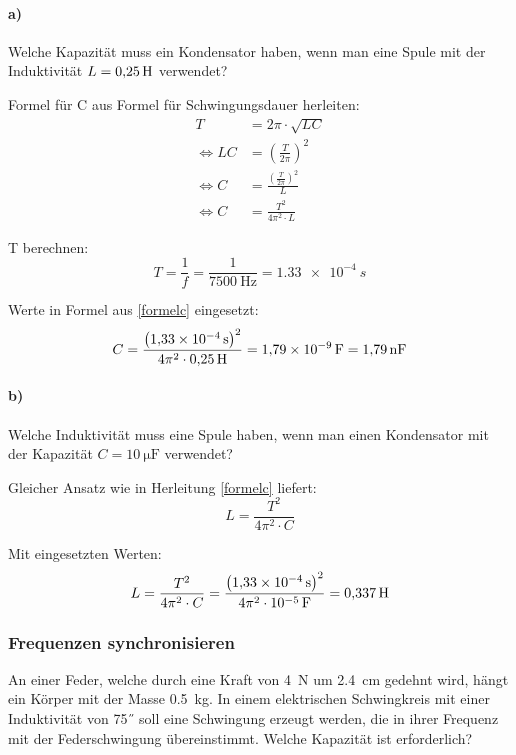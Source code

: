 \documentclass{ajc}
\begin{document}
	\paragraph{a)} Welche Kapazität muss ein Kondensator haben, wenn man eine Spule mit der Induktivität $L = \SI{0,25}{\H}$ verwendet?
	
	Formel für C aus Formel für Schwingungsdauer herleiten:
	\begin{equation}\label{formelc}
		\begin{split}
			T &= 2\pi \cdot \sqrt{LC} \\
			\Leftrightarrow LC &= \left(\frac{T}{2\pi}\right)^2 \\
			\Leftrightarrow C &= \frac{\left(\frac{T}{2\pi}\right)^2}{L} \\
			\Leftrightarrow C &= \frac{T^2}{4\pi^2 \cdot L}
		\end{split}
	\end{equation}
	
	T berechnen:
	\begin{equation}
		T = \frac{1}{f} = \frac{1}{\SI{7500}{\Hz}} = \SI{1,33e-4}{s}
	\end{equation}
	
	Werte in Formel aus \ref{formelc} eingesetzt:
	\begin{equation}
		C = \frac{\left(\SI{1,33e-4}{s}\right)^2}{4\pi^2 \cdot \SI{0,25}{\H}} = \SI{1,79e-9}{\farad} = \SI{1,79}{\nano\farad}
	\end{equation}
	
	\paragraph{b)} Welche Induktivität muss eine Spule haben, wenn man einen Kondensator mit der Kapazität $C = \SI{10}{\micro\farad}$ verwendet?
	
	Gleicher Ansatz wie in Herleitung \ref{formelc} liefert:
	\begin{equation}
		L = \frac{T^2}{4\pi^2 \cdot C}
	\end{equation}
	
	Mit eingesetzten Werten:
	\begin{equation}
		L = \frac{T^2}{4\pi^2 \cdot C} = \frac{\left(\SI{1,33e-4}{s}\right)^2}{4\pi^2 \cdot \SI{e-5}{\farad}} = \SI{0,337}{\H}
	\end{equation}
	
	\subsubsection{Frequenzen synchronisieren}
	An einer Feder, welche durch eine Kraft von \SI{4}{\newton} um \SI{2,4}{\centi\meter} gedehnt wird, hängt ein Körper mit der Masse \SI{0,5}{\kilogram}. In einem elektrischen Schwingkreis mit einer Induktivität von \SI{75}{\H} soll eine Schwingung erzeugt werden, die in ihrer Frequenz mit der Federschwingung übereinstimmt. Welche Kapazität ist erforderlich?
	
\end{document}
